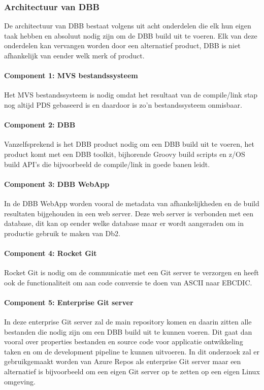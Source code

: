 \subsubsection{Architectuur van DBB}
De architectuur van DBB bestaat volgens \textcite{IBM2021a} uit acht onderdelen die elk hun eigen taak hebben en absoluut nodig zijn om de DBB build uit te voeren. Elk van deze onderdelen kan vervangen worden door een alternatief product, DBB is niet afhankelijk van eender welk merk of product.
\paragraph{Component 1: MVS bestandssysteem}
Het MVS bestandssysteem is nodig omdat het resultaat van de compile/link stap nog altijd PDS gebaseerd is en daardoor is zo'n bestandssysteem onmisbaar.
\paragraph{Component 2: DBB}
Vanzelfsprekend is het DBB product nodig om een DBB build uit te voeren, het product komt met een DBB toolkit, bijhorende Groovy build scripts en z/OS build API's die bijvoorbeeld de compile/link in goede banen leidt.
\paragraph{Component 3: DBB WebApp}
In de DBB WebApp worden vooral de metadata van afhankelijkheden en de build resultaten bijgehouden in een web server. Deze web server is verbonden met een database, dit kan op eender welke database maar er wordt aangeraden om in productie gebruik te maken van Db2.
\paragraph{Component 4: Rocket Git}
Rocket Git is nodig om de communicatie met een Git server te verzorgen en heeft ook de functionaliteit om aan code conversie te doen van ASCII naar EBCDIC.
\paragraph{Component 5: Enterprise Git server}
In deze enterprise Git server zal de main repository komen en daarin zitten alle bestanden die nodig zijn om een DBB build uit te kunnen voeren. Dit gaat dan vooral over properties bestanden en source code voor applicatie ontwikkeling taken en om de development pipeline te kunnen uitvoeren. In dit onderzoek zal er gebruikgemaakt worden van Azure Repos als enterprise Git server maar een alternatief is bijvoorbeeld om een eigen Git server op te zetten op een eigen Linux omgeving.
